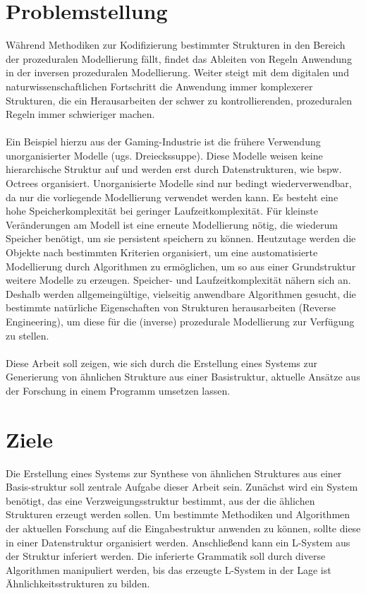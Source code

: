 \section{Problemstellung}
Während Methodiken zur Kodifizierung bestimmter Strukturen in den Bereich der prozeduralen Modellierung fällt,
findet das Ableiten von Regeln Anwendung in der inversen prozeduralen Modellierung.
Weiter steigt mit dem digitalen und naturwissenschaftlichen Fortschritt die Anwendung immer komplexerer Strukturen, die
ein Herausarbeiten der schwer zu kontrollierenden, prozeduralen Regeln immer schwieriger machen.
\\~\\
Ein Beispiel hierzu aus der Gaming-Industrie ist die frühere Verwendung unorganisierter Modelle (ugs. Dreieckssuppe).
Diese Modelle weisen keine hierarchische Struktur auf und werden erst durch Datenstrukturen, wie bspw. Octrees organisiert.
Unorganisierte Modelle sind nur bedingt wiederverwendbar, da nur die vorliegende Modellierung verwendet werden kann.
Es besteht eine hohe Speicherkomplexität bei geringer Laufzeitkomplexität.
Für kleinste Veränderungen am Modell ist eine erneute Modellierung nötig, die wiederum Speicher benötigt, um sie
persistent speichern zu können.
Heutzutage werden die Objekte nach bestimmten Kriterien organisiert, um eine austomatisierte Modellierung durch Algorithmen
zu ermöglichen, um so aus einer Grundstruktur weitere Modelle zu erzeugen.
Speicher- und Laufzeitkomplexität nähern sich an.
Deshalb werden allgemeingültige, vielseitig anwendbare Algorithmen gesucht, die bestimmte natürliche Eigenschaften
von Strukturen herausarbeiten (Reverse Engineering), um diese für die (inverse) prozedurale Modellierung zur
Verfügung zu stellen.
\\~\\
Diese Arbeit soll zeigen, wie sich durch die Erstellung eines Systems zur Generierung von ähnlichen Strukture aus einer
Basistruktur, aktuelle Ansätze aus der Forschung in einem Programm umsetzen lassen.

\newpage

\section{Ziele}
Die Erstellung eines Systems zur Synthese von ähnlichen Struktures aus einer Basis-struktur soll zentrale Aufgabe dieser
Arbeit sein.
Zunächst wird ein System benötigt, das eine Verzweigungsstruktur bestimmt, aus der die ählichen Strukturen erzeugt
werden sollen.
Um bestimmte Methodiken und Algorithmen der aktuellen Forschung auf die Eingabestruktur anwenden zu können, sollte diese
in einer Datenstruktur organisiert werden.
Anschließend kann ein L-System aus der Struktur inferiert werden.
Die inferierte Grammatik soll durch diverse Algorithmen manipuliert werden, bis das erzeugte L-System in der Lage ist
Ähnlichkeitsstrukturen zu bilden.

